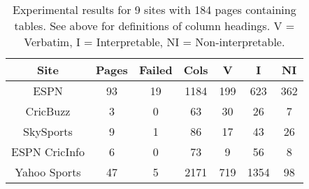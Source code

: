 \begin{table*}[hbtp]
\centering
\caption{Experimental results for 9 sites with 184 pages containing tables. See above for definitions of column headings. V = Verbatim, I = Interpretable, NI = Non-interpretable.}
\begin{tabular}{ |c|c|c|c|c|c|c| }
 \hline
 Site & Pages & Failed & Cols & V & I & NI \\
 \hline
 ESPN & 93 & 19 & 1184 & 199 & 623 & 362 \\
 \hline
 CricBuzz & 3 & 0 & 63 & 30 & 26 & 7\\
 \hline
 SkySports & 9 & 1 & 86 & 17 & 43 & 26 \\
 \hline
 ESPN CricInfo & 6 & 0 & 73 & 9 & 56 & 8 \\
 \hline
 Yahoo Sports & 47 & 5 & 2171 & 719 & 1354 & 98 \\


\end{tabular}
\end{table*}
